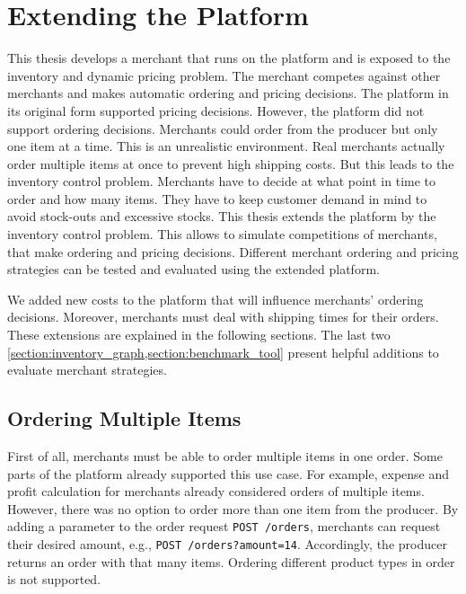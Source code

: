
\chapter{Extending the \pricewars Platform}

This thesis develops a merchant that runs on the \pricewars platform and is exposed to the inventory and dynamic pricing problem.
The merchant competes against other merchants and makes automatic ordering and pricing decisions.
The platform in its original form supported pricing decisions.
However, the platform did not support ordering decisions.
Merchants could order from the producer but only one item at a time.
This is an unrealistic environment.
Real merchants actually order multiple items at once to prevent high shipping costs.
But this leads to the inventory control problem.
Merchants have to decide at what point in time to order and how many items.
They have to keep customer demand in mind to avoid stock-outs and excessive stocks.
This thesis extends the \pricewars platform by the inventory control problem.
This allows to simulate competitions of merchants, that make ordering and pricing decisions.
Different merchant ordering and pricing strategies can be tested and evaluated using the extended platform.

We added new costs to the platform that will influence merchants' ordering decisions.
Moreover, merchants must deal with shipping times for their orders.
These extensions are explained in the following sections.
The last two \cref{section:inventory_graph,section:benchmark_tool} present helpful additions to evaluate merchant strategies.

\section{Ordering Multiple Items}
\label{section:multiple_items}
First of all, merchants must be able to order multiple items in one order.
Some parts of the platform already supported this use case.
For example, expense and profit calculation for merchants already considered orders of multiple items.
However, there was no option to order more than one item from the producer.
By adding a parameter to the order request \texttt{POST /orders}, merchants can request their desired amount, e.g., \texttt{POST /orders?amount=14}.
Accordingly, the producer returns an order with that many items.
Ordering different product types in order is not supported.

